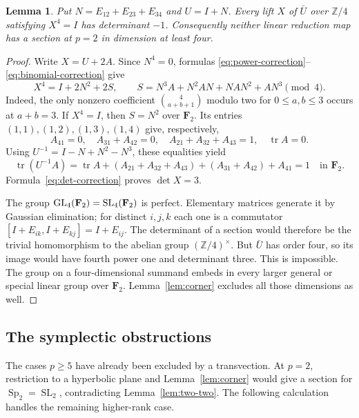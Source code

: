 \documentclass[11pt]{article}
\DeclareMathOperator{\SL}{SL}\DeclareMathOperator{\Sp}{Sp}
\newtheorem{lemma}[theorem]{Lemma}\newtheorem{proposition}[theorem]{Proposition}
\theoremstyle{definition}\newtheorem{definition}[theorem]{Definition}
\theoremstyle{remark}\newtheorem{remark}[theorem]{Remark}
\begin{document}
\begin{lemma}\label{lem:four-two}
Put $N=E_{12}+E_{23}+E_{34}$ and $U=I+N$. Every lift $X$ of $\bar U$
over $\mathbb Z/4$ satisfying $X^4=I$ has determinant $-1$.
Consequently neither linear reduction map has a section at $p=2$ in
dimension at least four.
\end{lemma}
\begin{proof}
Write $X=U+2A$. Since $N^4=0$, formulas
\eqref{eq:power-correction}--\eqref{eq:binomial-correction} give
\[
 X^4=I+2N^2+2S,\qquad
 S=N^3A+N^2AN+NAN^2+AN^3\pmod4.
\]
Indeed, the only nonzero coefficient $\binom4{a+b+1}$ modulo two for
$0\leq a,b\leq3$ occurs at $a+b=3$. If $X^4=I$, then $S=N^2$ over
$\mathbf F_2$. Its entries $(1,1),(1,2),(1,3),(1,4)$ give, respectively,
\[
 A_{41}=0,\quad A_{31}+A_{42}=0,\quad
 A_{21}+A_{32}+A_{43}=1,\quad\operatorname{tr}A=0.
\]
Using $U^{-1}=I-N+N^2-N^3$, these equalities yield
\[
 \operatorname{tr}(U^{-1}A)
 =\operatorname{tr}A+(A_{21}+A_{32}+A_{43})
   +(A_{31}+A_{42})+A_{41}=1
 \quad\text{in }\mathbf F_2.
\]
Formula~\eqref{eq:det-correction} proves $\det X=3$.

The group $\GL_4(\mathbf F_2)=\SL_4(\mathbf F_2)$ is perfect.
Elementary matrices generate it by Gaussian elimination; for distinct
$i,j,k$ each one is a commutator
$[I+E_{ik},I+E_{kj}]=I+E_{ij}$.
The determinant of a section would therefore be the trivial homomorphism
to the abelian group $(\mathbb Z/4)^\times$. But $\bar U$ has order four,
so its image would have fourth power one and determinant three. This is
impossible. The group on a four-dimensional summand embeds in every
larger general or special linear group over $\mathbf F_2$.
Lemma~\ref{lem:corner} excludes all those dimensions as well.
\end{proof}

\subsection{The symplectic obstructions}

The cases $p\geq5$ have already been excluded by a transvection. At $p=2$,
restriction to a hyperbolic plane and Lemma~\ref{lem:corner} would give a
section for $\Sp_2=\SL_2$, contradicting Lemma~\ref{lem:two-two}.
The following calculation handles the remaining higher-rank case.
\end{document}
